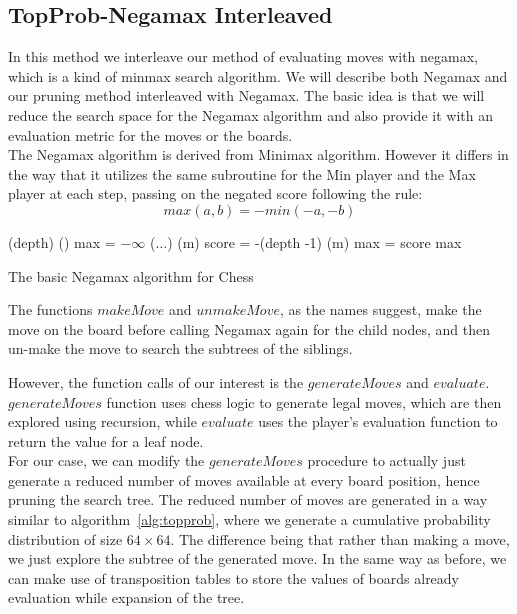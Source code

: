 \subsection{TopProb-Negamax Interleaved}
\label{subsection:interleaved}
In this method we interleave our method of evaluating moves with negamax, which 
is a kind of minmax search algorithm. We will 
describe both Negamax and our pruning method interleaved with Negamax.
The basic idea is that we will reduce the search space for the Negamax 
algorithm and also provide it with an evaluation metric for the moves or the 
boards.\\
The Negamax algorithm is derived from Minimax algorithm. However it differs in 
the way that it utilizes the same subroutine for the Min player and the Max 
player at each step, passing on the negated score following the rule:
\[max(a,b) = -min(-a,-b)\]
\begin{algorithm}[h]
 \begin{algorithmic}[1]
 	(depth)
	  \Return {}()
 	\EndIf
 	\State max = $-\infty$
 	\State {}($\dots$)
	  \State {}(m)
	  \State score = -(depth -1)
	  \State {}(m)
	    \State max = score
	  \EndIf
	\EndWhile
	\Return max
    \EndProcedure
 \end{algorithmic}
 \caption{The basic Negamax algorithm for Chess}
 \label{alg:negamax}
\end{algorithm}
 The functions $makeMove$ and $unmakeMove$, as the names suggest, make the move 
on the board before calling Negamax again for the child nodes, and then un-make 
the move to search the subtrees of the siblings.

However, the function calls of our interest is the $generateMoves$ and 
$evaluate$. $generateMoves$ function uses chess logic to generate 
legal moves, which are then explored using recursion, while $evaluate$ uses the 
player's evaluation function to return the value for a leaf node.\\

For our case, we can modify the $generateMoves$ procedure to actually just 
generate a reduced number of moves available at every board position, hence 
pruning the search tree. The reduced number of moves are generated in a way 
similar to algorithm~\ref{alg:topprob}, where we generate a 
cumulative probability distribution of size $64\times 64$. The difference being 
that rather than making a move, we just explore the subtree of the generated 
move. In the same way as before, we can make use of transposition tables to 
store the values of boards already evaluation while expansion of the tree.\\

